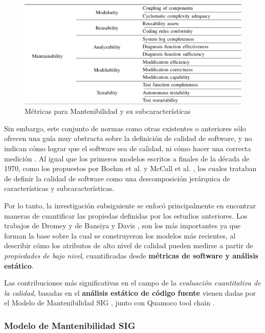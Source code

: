 \begin{figure}
    \label{Metrics}
    \includegraphics[width=12cm]{quality_metrics/quality_metrics.png}
    \centering
    \caption{Métricas para Mantenibilidad y su subcaracterísticas}
\end{figure}

Sin embargo, este conjunto de normas como otras existentes o anteriores sólo ofrecen una
guía muy abstracta sobre la definición de calidad de software, y no indican cómo lograr
que el software sea de calidad, ni cómo hacer una correcta medición \cite{Relf04}.
Al igual que los primeros modelos escritos a finales de la década de 1970, como los
propuestos por Boehm et al. \cite{Boehm1978} y McCall et al. \cite{McCall1977}, los cuales trataban
de definir la calidad de software como una descomposición jerárquica de características y
subcaracterísticas.

Por lo tanto, la investigación subsiguiente se enfocó principalmente en encontrar maneras de
cuantificar las propiedas definidas por los estudios anteriores.
Los trabajos de Dromey \cite{Dromey1995} y de Bansiya y Davis \cite{Bansiya2002}, son los más 
importantes ya que forman la base sobre la cual se construyeron los modelos más recientes, al 
describir cómo los atributos de alto nivel de calidad pueden medirse a partir de \textit{propiedades
de bajo nivel}, cuantificadas desde \textbf{métricas de software y análisis estático}.

Las contribuciones más significativas en el campo de la \textit{evaluación cuantitativa de la calidad},
basadas en el \textbf{análisis estático de código fuente} vienen dadas por el Modelo de Mantenibilidad 
SIG \cite{Heitlager2007}, junto con Quamoco tool chain \cite{Wagner2012}.

\subsubsection{Modelo de Mantenibilidad SIG}

